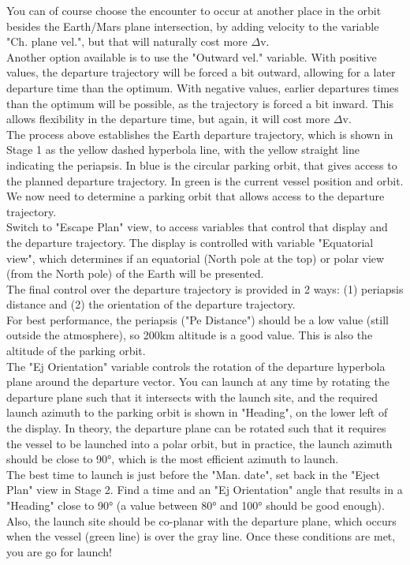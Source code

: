 \documentclass[Orbiter User Manual.tex]{subfiles}
\begin{document}
You can of course choose the encounter to occur at another place in the orbit besides the Earth/Mars plane intersection, by adding velocity to the variable "Ch. plane vel.", but that will naturally cost more $\Delta$v.\\
Another option available is to use the "Outward vel." variable. With positive values, the departure trajectory will be forced a bit outward, allowing for a later departure time than the optimum. With negative values, earlier departures times than the optimum will be possible, as the trajectory is forced a bit inward. This allows flexibility in the departure time, but again, it will cost more $\Delta$v.\\
The process above establishes the Earth departure trajectory, which is shown in Stage 1 as the yellow dashed hyperbola line, with the yellow straight line indicating the periapsis. In blue is the circular parking orbit, that gives access to the planned departure trajectory. In green is the current vessel position and orbit. We now need to determine a parking orbit that allows access to the departure trajectory.\\
Switch to "Escape Plan" view, to access variables that control that display and the departure trajectory. The display is controlled with variable "Equatorial view", which determines if an equatorial (North pole at the top) or polar view (from the North pole) of the Earth will be presented.\\
The final control over the departure trajectory is provided in 2 ways: (1) periapsis distance and (2) the orientation of the departure trajectory.\\
For best performance, the periapsis ("Pe Distance") should be a low value (still outside the atmosphere), so 200km altitude is a good value. This is also the altitude of the parking orbit.\\
The "Ej Orientation" variable controls the rotation of the departure hyperbola plane around the departure vector. You can launch at any time by rotating the departure plane such that it intersects with the launch site, and the required launch azimuth to the parking orbit is shown in "Heading", on the lower left of the display. In theory, the departure plane can be rotated such that it requires the vessel to be launched into a polar orbit, but in practice, the launch azimuth should be close to 90°, which is the most efficient azimuth to launch.\\
The best time to launch is just before the "Man. date", set back in the "Eject Plan" view in Stage 2. Find a time and an "Ej Orientation" angle that results in a "Heading" close to 90° (a value between 80° and 100° should be good enough). Also, the launch site should be co-planar with the departure plane, which occurs when the vessel (green line) is over the gray line. Once these conditions are met, you are go for launch!\\
\end{document}
